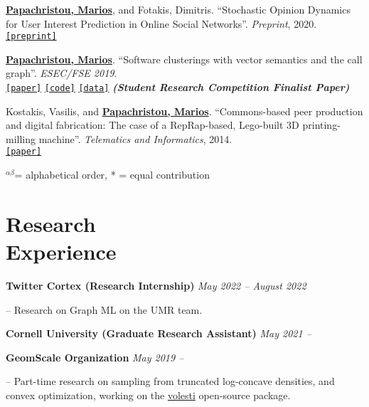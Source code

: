 \documentclass[margin]{res}
\newcommand{\alphabeticalorder}[0]{\ensuremath {^{\alpha \beta}}}
\newcommand{\specialurl}[2]{\href {#2} {\texttt{[#1]}}}
\newcommand{\preprint}[1]{\specialurl {preprint} {#1}}
\newcommand{\code}[1]{\specialurl {code} {#1}}
\newcommand{\data}[1]{\specialurl {data} {#1}}
\newcommand{\paper}[1]{\specialurl {paper} {#1}}
\newcommand{\authorref}[1]{\underline {\textbf{#1}}}
\newcommand{\authorme}{\authorref{Papachristou, Marios}}
\begin{document}
\begin{resume}
\begin{compactenum}
    \item \authorme, and Fotakis, Dimitris. ``Stochastic Opinion Dynamics for User Interest Prediction in Online Social Networks''.  \emph{Preprint}, 2020. \\ \preprint{https://www.researchgate.net/publication/353006940_Stochastic_Opinion_Dynamics_for_Interest_Prediction_in_Social_Networks}
    \item \authorme. ``Software clusterings with vector semantics and the call graph''. \emph{ESEC/FSE 2019}. \\ \paper{https://dl.acm.org/citation.cfm?id=3342483} \code{https://github.com/papachristoumarios/sade} \data{http://doi.org/10.5281/zenodo.2652487} \textbf{\emph{(Student Research Competition Finalist Paper)}}
    \item Kostakis, Vasilis, and \authorme. ``Commons-based peer production and digital fabrication: The case of a RepRap-based, Lego-built 3D printing-milling machine''. \emph{Telematics and Informatics}, 2014. \\ \paper{https://bit.ly/2JRoisV} 
    
\end{compactenum}

{
\footnotesize
\alphabeticalorder  = alphabetical order, * = equal contribution
}

\section{Research \\ Experience}

\textbf{Twitter Cortex (Research Internship)} \hfill \emph{May 2022 -- August 2022}
\begin{compactitem}
\item[--] Research on Graph ML on the UMR team. 
\end{compactitem}

\textbf{Cornell University (Graduate Research Assistant)} \hfill \emph{May 2021 --}

\textbf{GeomScale Organization} \hfill \emph{May 2019 --}

\begin{compactitem}
	\item[--] Part-time research on sampling from truncated log-concave densities, and convex optimization, working on the \href{https://github.com/GeomScale/volesti}{volesti} open-source package.
\end{compactitem}




\end{resume}
\end{document}
